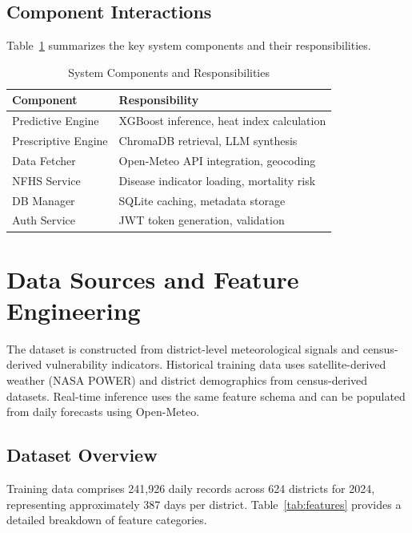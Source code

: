 \documentclass[conference]{IEEEtran}
\begin{document}
\subsection{Component Interactions}
Table~\ref{tab:components} summarizes the key system components and their responsibilities.

\begin{table}[htbp]
\centering
\caption{System Components and Responsibilities}
\begin{tabular}{@{}lp{5cm}@{}}
\toprule
\textbf{Component} & \textbf{Responsibility} \\
\midrule
Predictive Engine & XGBoost inference, heat index calculation \\
Prescriptive Engine & ChromaDB retrieval, LLM synthesis \\
Data Fetcher & Open-Meteo API integration, geocoding \\
NFHS Service & Disease indicator loading, mortality risk \\
DB Manager & SQLite caching, metadata storage \\
Auth Service & JWT token generation, validation \\
\bottomrule
\end{tabular}
\label{tab:components}
\end{table}

\section{Data Sources and Feature Engineering}
\label{sec:data}

The dataset is constructed from district-level meteorological signals and census-derived vulnerability indicators. Historical training data uses satellite-derived weather (NASA POWER) and district demographics from census-derived datasets. Real-time inference uses the same feature schema and can be populated from daily forecasts using Open-Meteo.

\subsection{Dataset Overview}
Training data comprises 241,926 daily records across 624 districts for 2024, representing approximately 387 days per district. Table~\ref{tab:features} provides a detailed breakdown of feature categories.
\end{document}
